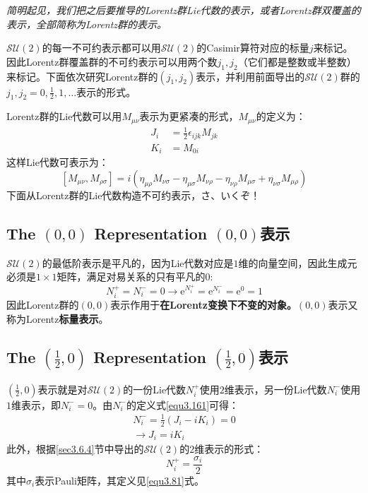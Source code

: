 {\itshape 简明起见，我们把之后要推导的Lorentz群Lie代数的表示，或者Lorentz群双覆盖的表示，全部简称为Lorentz群的表示。 }

$\mathcal{SU}(2)$的每一不可约表示都可以用$\mathcal{SU}(2)$的Casimir算符对应的标量$j$来标记。因此Lorentz群覆盖群的不可约表示可以用两个数$j_1, j_2$（它们都是整数或半整数）来标记。下面依次研究Lorentz群的$(j_1, j_2)$表示，并利用前面导出的$\mathcal{SU}(2)$群的$ j_1,j_2 = 0, \frac{1}{2}, 1, \dots$表示的形式。


Lorentz群的Lie代数可以用$M_{\mu \nu}$表示为更紧凑的形式，$M_{\mu \nu}$的定义为：
\begin{align}
\label{equ3.165}
	J_i &= \frac{1}{2} \epsilon_{ijk} M_{jk} \\
\label{equ3.166}
	K_i &= M_{0i}
\end{align}
这样Lie代数可表示为：
\begin{equation}
\label{equ3.167}
	[M_{\mu \nu}, M_{\rho \sigma}] = i(\eta_{\mu \rho} M_{\nu \sigma} - \eta_{\mu \sigma} M_{\nu \rho} - \eta_{\nu \rho} M_{\mu \sigma} + \eta_{\nu \sigma} M_{\mu \rho})
\end{equation}
下面从Lorentz群的Lie代数构造不可约表示，さ、いくぞ！

\subsection[$(0, 0)$表示]{The $(0, 0)$ Representation \quad $(0, 0)$表示}
\label{sec3.7.4}
$\mathcal{SU}(2)$的最低阶表示是平凡的，因为Lie代数对应是$1$维的向量空间，因此生成元必须是$1 \times 1$矩阵，满足对易关系的只有平凡的$0$:
\begin{equation}
\label{equ3.168}
	N_i^+ = N_i^- = 0 \rightarrow \mathrm{e}^{N_i^+} = \mathrm{e}^{N_i^-} = \mathrm{e}^0 = 1
\end{equation}
因此Lorentz群的$(0, 0)$表示作用于{\bfseries 在Lorentz变换下不变的对象。$(0, 0)$}表示又称为Lorentz{\bfseries 标量表示}。


\subsection[$(\frac{1}{2}, 0)$表示]{The $(\frac{1}{2}, 0)$ Representation \quad $(\frac{1}{2}, 0)$表示}
\label{sec3.7.5}
$(\frac{1}{2}, 0)$表示就是对$\mathcal{SU}(2)$的一份Lie代数$N_i^+$使用$2$维表示，另一份Lie代数$N_i^-$使用$1$维表示，即$N_i^- = 0$。由$N_i^-$的定义式\eqref{equ3.161}可得：
\begin{align}
\label{equ3.169}
	N_i^- = \frac{1}{2} (J_i - i K_i) = 0 \\
\label{equ3.170}
	\rightarrow J_i = i K_i
\end{align}
此外，根据\ref{sec3.6.4}节中导出的$\mathcal{SU}(2)$的$2$维表示的形式：
\begin{equation}
\label{equ3.171}
	N_i^+ = \frac{\sigma_i}{2}
\end{equation}
其中$\sigma_i$表示Pauli矩阵，其定义见\eqref{equ3.81}式。

